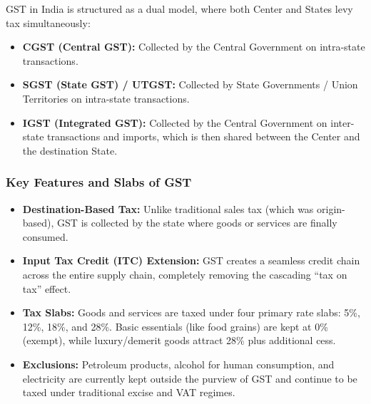\documentclass[12pt,a4paper]{article}
\begin{document}
\begin{tcolorbox}[defbox, title={Core Components of GST}]
GST in India is structured as a dual model, where both Center and States levy tax simultaneously:
\begin{itemize}[leftmargin=*, itemsep=2pt, topsep=0pt]
  \item \textbf{CGST (Central GST):} Collected by the Central Government on intra-state transactions.
  \item \textbf{SGST (State GST) / UTGST:} Collected by State Governments / Union Territories on intra-state transactions.
  \item \textbf{IGST (Integrated GST):} Collected by the Central Government on inter-state transactions and imports, which is then shared between the Center and the destination State.
\end{itemize}
\end{tcolorbox}

\subsubsection{Key Features and Slabs of GST}
\begin{itemize}[leftmargin=*, itemsep=3.5pt]
  \item \textbf{Destination-Based Tax:} Unlike traditional sales tax (which was origin-based), GST is collected by the state where goods or services are finally consumed.
  \item \textbf{Input Tax Credit (ITC) Extension:} GST creates a seamless credit chain across the entire supply chain, completely removing the cascading ``tax on tax'' effect.
  \item \textbf{Tax Slabs:} Goods and services are taxed under four primary rate slabs: 5\%, 12\%, 18\%, and 28\%. Basic essentials (like food grains) are kept at 0\% (exempt), while luxury/demerit goods attract 28\% plus additional cess.
  \item \textbf{Exclusions:} Petroleum products, alcohol for human consumption, and electricity are currently kept outside the purview of GST and continue to be taxed under traditional excise and VAT regimes.
\end{itemize}
\end{document}
